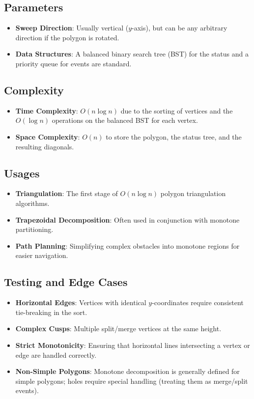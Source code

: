 \subsection{Parameters}

\begin{itemize}
\item \textbf{Sweep Direction}: Usually vertical ($y$-axis), but can be any arbitrary direction if the polygon is rotated.
\item \textbf{Data Structures}: A balanced binary search tree (BST) for the status and a priority queue for events are standard.
\end{itemize}

\subsection{Complexity}

\begin{itemize}
\item \textbf{Time Complexity}: $O(n \log n)$ due to the sorting of vertices and the $O(\log n)$ operations on the balanced BST for each vertex.
\item \textbf{Space Complexity}: $O(n)$ to store the polygon, the status tree, and the resulting diagonals.
\end{itemize}

\subsection{Usages}

\begin{itemize}
\item \textbf{Triangulation}: The first stage of $O(n \log n)$ polygon triangulation algorithms.
\item \textbf{Trapezoidal Decomposition}: Often used in conjunction with monotone partitioning.
\item \textbf{Path Planning}: Simplifying complex obstacles into monotone regions for easier navigation.
\end{itemize}

\subsection{Testing and Edge Cases}

\begin{itemize}
\item \textbf{Horizontal Edges}: Vertices with identical $y$-coordinates require consistent tie-breaking in the sort.
\item \textbf{Complex Cusps}: Multiple split/merge vertices at the same height.
\item \textbf{Strict Monotonicity}: Ensuring that horizontal lines intersecting a vertex or edge are handled correctly.
\item \textbf{Non-Simple Polygons}: Monotone decomposition is generally defined for simple polygons; holes require special handling (treating them as merge/split events).
\end{itemize}

